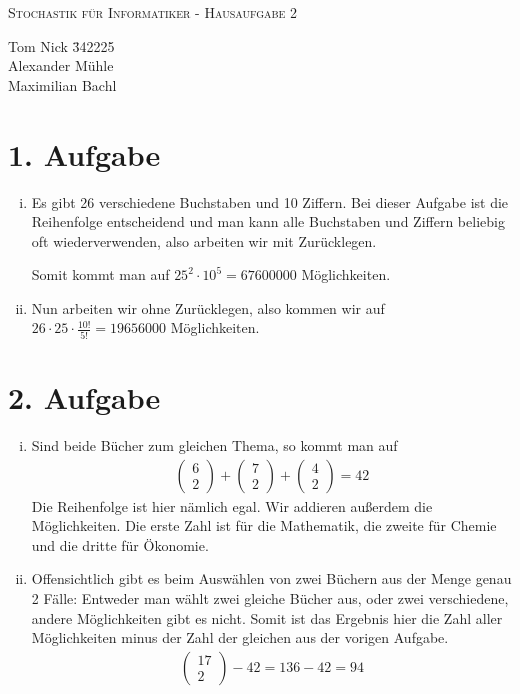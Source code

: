 \documentclass[10pt,a4paper,parskip=half]{scrartcl}
\begin{document}
\begin{center}
\textsc{\Large{Stochastik für Informatiker - Hausaufgabe 2}} \\
\end{center}
\begin{tabbing}
Tom Nick \hspace{1.4cm}\= 342225\\
Alexander Mühle\\
Maximilian Bachl
\end{tabbing}
\section*{1. Aufgabe}
\begin{enumerate}[(i)]
\item 
	Es gibt 26 verschiedene Buchstaben und 10 Ziffern. Bei dieser Aufgabe ist die Reihenfolge entscheidend und man kann alle Buchstaben und Ziffern beliebig oft wiederverwenden, also arbeiten wir mit Zurücklegen.

	Somit kommt man auf $25^2 \cdot 10^5 = 67600000$ Möglichkeiten.
\item
	Nun arbeiten wir ohne Zurücklegen, also kommen wir auf $26 \cdot 25 \cdot \frac{10!}{5!} = 19656000$ Möglichkeiten.
\end{enumerate}
\section*{2. Aufgabe}
\begin{enumerate}[(i)]
\item
	Sind beide Bücher zum gleichen Thema, so kommt man auf 
	\begin{align*}
	\begin{pmatrix}6\\2\end{pmatrix}+\begin{pmatrix}7\\2\end{pmatrix}+\begin{pmatrix}4\\2\end{pmatrix} = 42
	\end{align*}
	Die Reihenfolge ist hier nämlich egal. Wir addieren außerdem die Möglichkeiten. Die erste Zahl ist für die Mathematik, die zweite für Chemie und die dritte für Ökonomie.
\item
	Offensichtlich gibt es beim Auswählen von zwei Büchern aus der Menge genau 2 Fälle: Entweder man wählt zwei gleiche Bücher aus, oder zwei verschiedene, andere Möglichkeiten gibt es nicht. Somit ist das Ergebnis hier die Zahl aller Möglichkeiten minus der Zahl der gleichen aus der vorigen Aufgabe.
	\begin{align*}
	\begin{pmatrix}17\\2\end{pmatrix} - 42 = 136 - 42 = 94
	\end{align*}
\end{enumerate}
\end{document}
